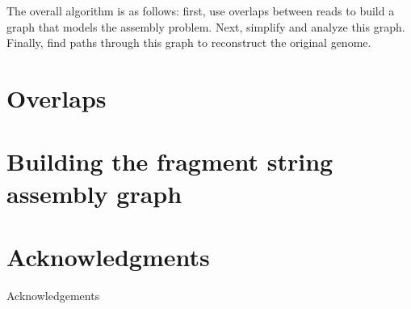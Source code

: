 \documentclass[10pt]{article}
\begin{document}
The overall algorithm is as follows: first, use overlaps between reads to build
a graph that models the assembly problem.  Next, simplify and analyze this
graph.  Finally, find paths through this graph to reconstruct the original
genome.

\section{Overlaps}

\section{Building the fragment string assembly graph}


\section*{Acknowledgments}

Acknowledgements



\end{document}
